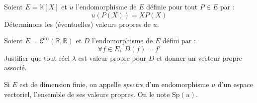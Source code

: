 \documentclass[a4paper,10pt]{report}
\begin{document}
%
%
%

\begin{ex} Soient $E = \mathbb{K}[X]$ et $u$ l'endomorphisme de $E$ définie pour tout $P \in E$ par :
$$ u(P(X))= XP(X)$$
Déterminons les (éventuelles) valeurs propres de $u$. 

\vspace{6cm}
%
%
%
\end{ex}

\begin{exa} Soient $E= \mathcal{C}^{\infty}(\mathbb{R}, \mathbb{R})$ et $D$ l'endomorphisme de $E$ défini par :
$$ \forall f \in E, \; D(f)=f'$$
Justifier que tout réel $\lambda$ est valeur propre pour $D$ et donner un vecteur propre associé.
\end{exa}

\begin{defin} Si $E$ est de dimension finie, on appelle \textit{spectre} d'un endomorphisme $u$ d'un espace vectoriel, l'ensemble de ses valeurs propres. On le note $\textrm{Sp}(u)$.
\end{defin}
\end{document}
